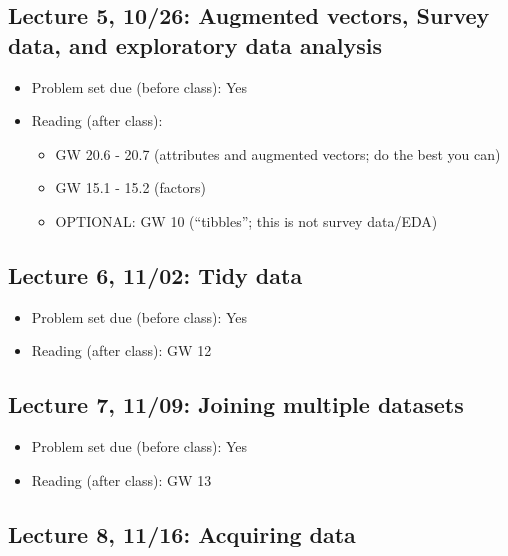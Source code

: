 \documentclass[11pt,]{article}
\providecommand{\tightlist}{%
  \setlength{\itemsep}{0pt}\setlength{\parskip}{0pt}}
\begin{document}
\subsection{Lecture 5, 10/26: Augmented vectors, Survey data, and
exploratory data
analysis}\label{lecture-5-1026-augmented-vectors-survey-data-and-exploratory-data-analysis}

\begin{itemize}
\tightlist
\item
  Problem set due (before class): Yes
\item
  Reading (after class):

  \begin{itemize}
  \tightlist
  \item
    GW 20.6 - 20.7 (attributes and augmented vectors; do the best you
    can)\\
  \item
    GW 15.1 - 15.2 (factors)
  \item
    OPTIONAL: GW 10 (``tibbles''; this is not survey data/EDA)
  \end{itemize}
\end{itemize}

\subsection{Lecture 6, 11/02: Tidy data}\label{lecture-6-1102-tidy-data}

\begin{itemize}
\tightlist
\item
  Problem set due (before class): Yes
\item
  Reading (after class): GW 12
\end{itemize}

\subsection{Lecture 7, 11/09: Joining multiple
datasets}\label{lecture-7-1109-joining-multiple-datasets}

\begin{itemize}
\tightlist
\item
  Problem set due (before class): Yes
\item
  Reading (after class): GW 13
\end{itemize}

\subsection{Lecture 8, 11/16: Acquiring
data}\label{lecture-8-1116-acquiring-data}
\end{document}
